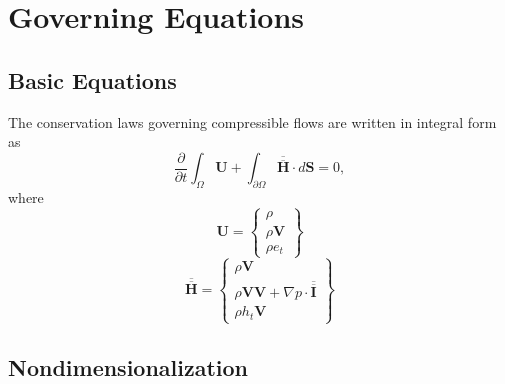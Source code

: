 
\section{Governing Equations}

\subsection{Basic Equations}

The conservation laws governing compressible flows are written in integral form as
\begin{equation}
\frac{\partial}{\partial t} \int_\Omega \mathbf{U}
+ \int_{\partial\Omega} \overline{\overline{\mathbf{H}}}\cdot d\mathbf{S} = 0,
\end{equation}
where
\[
\mathbf{U} = \left\{
\begin{array}{c}
\rho \\
\rho\mathbf{V} \\
\rho e_t
\end{array}
\right\}
\]
\[
\overline{\overline{\mathbf{H}}} = \left\{
\begin{array}{c}
\rho\mathbf{V} \\
\rho\mathbf{V}\mathbf{V} + \nabla p \cdot \overline{\overline{\mathbf{I}}} \\
\rho h_t \mathbf{V}
\end{array}
\right\}
\]

\subsection{Nondimensionalization}

